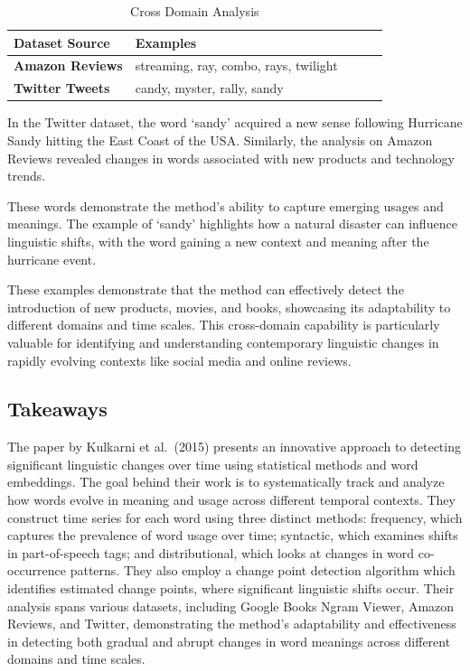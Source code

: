 \begin{table}[tbh]
\begin{tabular}{@{}lllll@{}}
\toprule
\textbf{Dataset Source} & \textbf{Examples}                     &  &  &  \\ \midrule
\textbf{Amazon Reviews} & streaming, ray, combo, rays, twilight &  &  &  \\
\textbf{Twitter Tweets} & candy, myster, rally, sandy           &  &  &  \\ \bottomrule
\end{tabular}
\caption{Cross Domain Analysis}
\label{tab:sources-examples}
\end{table}
\raggedbottom

In the Twitter dataset, the word `sandy' acquired a new sense following Hurricane Sandy hitting the East Coast of the USA\@.
Similarly, the analysis on Amazon Reviews revealed changes in words associated with new products and technology trends.

These words demonstrate the method’s ability to capture emerging usages and meanings.
The example of `sandy' highlights how a natural disaster can influence linguistic shifts, with the word gaining a new context and meaning after the hurricane event.

These examples demonstrate that the method can effectively detect the introduction of new products, movies, and books, showcasing its adaptability to different domains and time scales.
This cross-domain capability is particularly valuable for identifying and understanding contemporary linguistic changes in rapidly evolving contexts like social media and online reviews.

\subsection{Takeaways} \label{subsec:kulkarni-takeaways}
The paper by Kulkarni et al.\ (2015) presents an innovative approach to detecting significant linguistic changes over time using statistical methods and word embeddings.
The goal behind their work is to systematically track and analyze how words evolve in meaning and usage across different temporal contexts.
They construct time series for each word using three distinct methods:
frequency, which captures the prevalence of word usage over time;
syntactic, which examines shifts in part-of-speech tags;
and distributional, which looks at changes in word co-occurrence patterns.
They also employ a change point detection algorithm which identifies estimated change points, where significant linguistic shifts occur.
Their analysis spans various datasets, including Google Books Ngram Viewer, Amazon Reviews, and Twitter,
demonstrating the method’s adaptability and effectiveness in detecting both gradual and abrupt changes in word meanings across different domains and time scales.